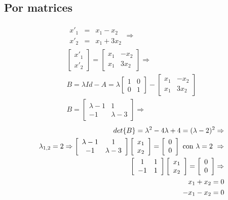 \documentclass[12pt,spanish,lettersize]{article}
\begin{document}
\subsection{Por matrices}
\begin{eqnarray}
\begin{array}{lcl}
x'_1 & = & x_1-x_2\\
x'_2 & = & x_1+3x_2
\end{array}\Rightarrow\\
\left[
\begin{array}{l}
x'_1 \\
x'_2
\end{array}
\right]=
\left[
\begin{array}{cc}
x_1&-x_2\\
x_1&3x_2
\end{array}
\right]\Rightarrow\\
B=\lambda Id - A = \lambda
\left[
\begin{array}{cc}
1&0\\
0&1
\end{array}
\right]
-
\left[
\begin{array}{cc}
x_1&-x_2\\
x_1&3x_2
\end{array}
\right]\\
B=
\left[
\begin{array}{cc}
\lambda-1&1\\
-1&\lambda-3
\end{array}
\right]\Rightarrow
\end{eqnarray}
\begin{eqnarray}
det\{B\}=\lambda^2-4\lambda+4=(\lambda-2)^2\Rightarrow\\
\lambda_{1,2}=2\Rightarrow
\left[
\begin{array}{cc}
\lambda-1&1\\
-1&\lambda-3
\end{array}
\right]\left[
\begin{array}{c}
x_1\\
x_2
\end{array}
\right]=\left[
\begin{array}{c}
0\\
0
\end{array}
\right]\textnormal{ con $\lambda=2$ }\Rightarrow\\\left[
\begin{array}{cc}
1&1\\
-1&\-1
\end{array}
\right]\left[
\begin{array}{c}
x_1\\
x_2
\end{array}
\right]=\left[
\begin{array}{c}
0\\
0
\end{array}
\right]\Rightarrow\\
x_1+x_2=0\\
-x_1-x_2=0
\end{eqnarray}
\end{document}
